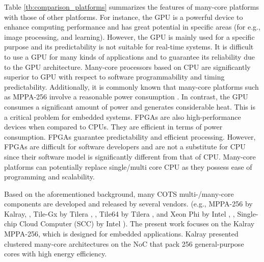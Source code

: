 Table \ref{tb:comparison_platforms} summarizes the features of many-core platforms with those of other platforms.
For instance, the GPU is a powerful device to enhance computing performance and has great potential in specific areas (for e.g., image processing, and learning).
However, the GPU is mainly used for a specific purpose and its predictability is not suitable for real-time systems.
It is difficult to use a GPU for many kinds of applications and to guarantee its reliability due to the GPU architecture.
Many-core processors based on CPU are significantly superior to GPU with respect to software programmability and timing predictability.
Additionally, it is commonly known that many-core platforms such as MPPA-256 involve a reasonable power consumption \cite{kanter2015kalray}.
In contrast, the GPU consumes a significant amount of power and generates considerable heat.
This is a critical problem for embedded systems.
FPGAs are also high-performance devices when compared to CPUs.
They are efficient in terms of power consumption.
FPGAs guarantee predictability and efficient processing.
However, FPGAs are difficult for software developers and are not a substitute for CPU since their software model is significantly different from that of CPU.
Many-core platforms can potentially replace single/multi core CPU as they possess ease of programming and scalability.

Based on the aforementioned background, many COTS multi-/many-core components are developed and released by several vendors.
(e.g., MPPA-256 by Kalray, \cite{de2014time}, Tile-Gx by Tilera \cite{ramey2011tile}, \cite{schooler2010tile}, Tile64 by Tilera \cite{bell2008tile64}, and Xeon Phi by Intel \cite{chrysos2014intel}, \cite{chrysos2012intel}, Single-chip Cloud Computer (SCC) by Intel \cite{baron2010single}).
The present work focuses on the Kalray MPPA-256, which is designed for embedded applications.
Kalray \cite{de2014time} presented clustered many-core architectures on the NoC that pack 256 general-purpose cores with high energy efficiency.


